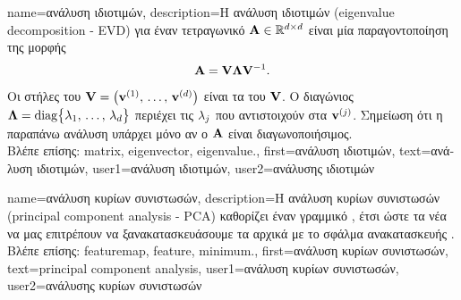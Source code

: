 {name={\foreignlanguage{greek}{ανάλυση ιδιοτιμών}}, 
	description={\foreignlanguage{greek}{Η ανάλυση ιδιοτιμών} 
		(eigenvalue decomposition - EVD) \foreignlanguage{greek}{για έναν τετραγωνικό}  
		${\bf A} \in \mathbb{R}^{d \times d}$ \foreignlanguage{greek}{είναι μία παραγοντοποίηση 
		της μορφής $${\bf A} = \mathbf{V} {\bm \Lambda} \mathbf{V}^{-1}.$$ 
		Οι στήλες του}  $\mathbf{V} = \big( {\bf v}^{(1)}, \,\ldots, \,{\bf v}^{(d)} \big)$ \foreignlanguage{greek}{είναι τα}  
		 \foreignlanguage{greek}{του}  $\mathbf{V}$. \foreignlanguage{greek}{Ο διαγώνιος}   
		 ${\bm \Lambda} = {\rm diag} \big\{ \lambda_{1}, \,\ldots, \,\lambda_{d} \big\}$ 
		\foreignlanguage{greek}{περιέχει τις}  $\lambda_{j}$ \foreignlanguage{greek}{που αντιστοιχούν στα} 
		 ${\bf v}^{(j)}$. \foreignlanguage{greek}{Σημείωση ότι η παραπάνω ανάλυση υπάρχει μόνο αν ο} 
		 ${\bf A}$ \foreignlanguage{greek}{είναι διαγωνοποιήσιμος.} \\
		\foreignlanguage{greek}{Βλέπε επίσης:} \gls{matrix}, \gls{eigenvector}, \gls{eigenvalue}.},
	first={\foreignlanguage{greek}{ανάλυση ιδιοτιμών}},
	text={\foreignlanguage{greek}{ανάλυση ιδιοτιμών}},
	user1={\foreignlanguage{greek}{ανάλυση ιδιοτιμών}}, %
	user2={\foreignlanguage{greek}{ανάλυσης ιδιοτιμών}} %
}

{name={\foreignlanguage{greek}{ανάλυση κυρίων συνιστωσών}}, 
	description={\foreignlanguage{greek}{Η ανάλυση κυρίων συνιστωσών} 
		(principal component analysis - PCA) \foreignlanguage{greek}{καθορίζει έναν γραμμικό} , \foreignlanguage{greek}{έτσι 
		ώστε τα νέα}  \foreignlanguage{greek}{να μας επιτρέπουν να ξανακατασκευάσουμε τα αρχικά}  
		\foreignlanguage{greek}{με το}  
		\foreignlanguage{greek}{σφάλμα ανακατασκευής} \cite{MLBasics}.\\
		\foreignlanguage{greek}{Βλέπε επίσης:} \gls{featuremap}, \gls{feature}, \gls{minimum}.},
	first={\foreignlanguage{greek}{ανάλυση κυρίων συνιστωσών}},
	text={principal component analysis},
	user1={\foreignlanguage{greek}{ανάλυση κυρίων συνιστωσών}}, %
	user2={\foreignlanguage{greek}{ανάλυσης κυρίων συνιστωσών}} %
}

